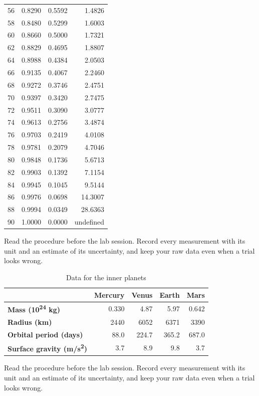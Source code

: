 \documentclass[11pt]{article}
\begin{document}
\begin{longtable}{rrrr}
56 & 0.8290 & 0.5592 & 1.4826 \\
58 & 0.8480 & 0.5299 & 1.6003 \\
60 & 0.8660 & 0.5000 & 1.7321 \\
62 & 0.8829 & 0.4695 & 1.8807 \\
64 & 0.8988 & 0.4384 & 2.0503 \\
66 & 0.9135 & 0.4067 & 2.2460 \\
68 & 0.9272 & 0.3746 & 2.4751 \\
70 & 0.9397 & 0.3420 & 2.7475 \\
72 & 0.9511 & 0.3090 & 3.0777 \\
74 & 0.9613 & 0.2756 & 3.4874 \\
76 & 0.9703 & 0.2419 & 4.0108 \\
78 & 0.9781 & 0.2079 & 4.7046 \\
80 & 0.9848 & 0.1736 & 5.6713 \\
82 & 0.9903 & 0.1392 & 7.1154 \\
84 & 0.9945 & 0.1045 & 9.5144 \\
86 & 0.9976 & 0.0698 & 14.3007 \\
88 & 0.9994 & 0.0349 & 28.6363 \\
90 & 1.0000 & 0.0000 & undefined \\
\end{longtable}

Read the procedure before the lab session. Record every measurement with its unit and an estimate of its uncertainty, and keep your raw data even when a trial looks wrong. 
\begin{table}[H]\centering
\caption{Data for the inner planets}
\begin{tabular}{l|rrrr}
 & \textbf{Mercury} & \textbf{Venus} & \textbf{Earth} & \textbf{Mars} \\
\hline
\textbf{Mass (10\textsuperscript{24} kg)} & 0.330 & 4.87 & 5.97 & 0.642 \\
\textbf{Radius (km)} & 2440 & 6052 & 6371 & 3390 \\
\textbf{Orbital period (days)} & 88.0 & 224.7 & 365.2 & 687.0 \\
\textbf{Surface gravity (m/s\textsuperscript{2})} & 3.7 & 8.9 & 9.8 & 3.7 \\
\end{tabular}
\end{table}

Read the procedure before the lab session. Record every measurement with its unit and an estimate of its uncertainty, and keep your raw data even when a trial looks wrong. 
\end{document}
